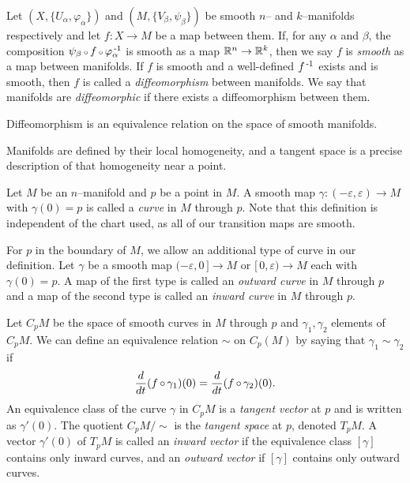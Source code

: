 \begin{defn}
	\label{def:smoothmap}
	Let $(X,\{U_\alpha,\varphi_\alpha\})$ and $(M,\{V_\beta,\psi_\beta\})$ be smooth $n$-- and $k$--manifolds respectively and let $f:X\to M$ be a map between them.
	If, for any $\alpha$ and $\beta$, the composition $\psi_\beta\comp f\comp \varphi_\alpha\inv$ is smooth as a map $\mathbb{R}^n\to\mathbb{R}^k$, then we say $f$ is \emph{smooth} as a map between manifolds.
	If $f$ is smooth and a well-defined $f^{\,\text{-}1}$ exists and is smooth, then $f$ is called a \emph{diffeomorphism} between manifolds.
	We say that manifolds are \emph{diffeomorphic} if there exists a diffeomorphism between them.
\end{defn}

\begin{prop}
	\label{prop:diffeoequiv}
	Diffeomorphism is an equivalence relation on the space of smooth manifolds.
\end{prop}

Manifolds are defined by their local homogeneity, and a tangent space is a precise description of that homogeneity near a point.

\begin{defn}
	\label{def:tangentspace}
	Let $M$ be an $n$--manifold and $p$ be a point in $M$.
	A smooth map $\gamma:(-\varepsilon,\varepsilon)\to M$ with $\gamma(0)=p$ is called a \emph{curve} in $M$ through $p$.
	Note that this definition is independent of the chart used, as all of our transition maps are smooth.
	
	For $p$ in the boundary of $M$, we allow an additional type of curve in our definition.
	Let $\gamma$ be a smooth map $(-\varepsilon,0\,] \to M$ or $[\,0,\varepsilon) \to M$ each with $\gamma(0)=p$.
	A map of the first type is called an \emph{outward curve} in $M$ through $p$ and a map of the second type is called an \emph{inward curve} in $M$ through $p$.
	
	Let $C_p M$ be the space of smooth curves in $M$ through $p$ and $\gamma_1, \gamma_2$ elements of $C_p M$.
	We can define an equivalence relation $\sim$ on $C_p(M)$ by saying that $\gamma_1\sim\gamma_2$ if
	\[
		\Ddt(f\comp\gamma_1)(0) = \Ddt(f\comp\gamma_2)(0).
	\]
	An equivalence class of the curve $\gamma$ in $C_p M$ is a \emph{tangent vector} at $p$ and is written as $\gamma'(0)$.
	The quotient $C_p M/\sim$ is the \emph{tangent space} at $p$, denoted $T_p M$.
	A vector $\gamma'(0)$ of $T_p M$ is called an \emph{inward vector} if the equivalence class $[\gamma]$ contains only inward curves, and an \emph{outward vector} if $[\gamma]$ contains only outward curves.
\end{defn}

